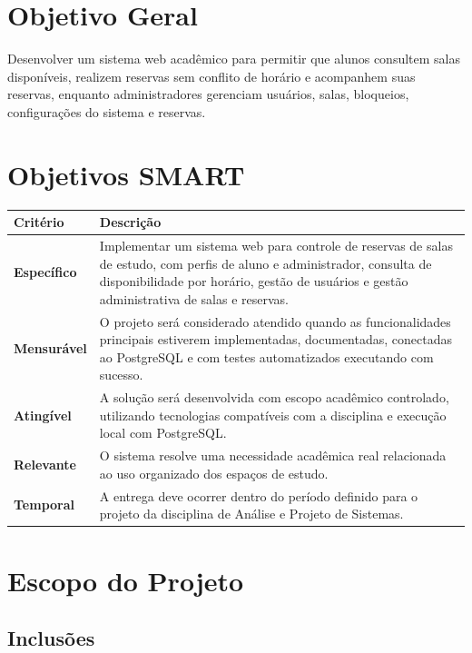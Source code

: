 \documentclass[12pt,a4paper]{article}
\begin{document}
\section{Objetivo Geral}

Desenvolver um sistema web acadêmico para permitir que alunos consultem salas disponíveis, realizem reservas sem conflito de horário e acompanhem suas reservas, enquanto administradores gerenciam usuários, salas, bloqueios, configurações do sistema e reservas.

\section{Objetivos SMART}

\begin{longtable}{|p{4cm}|p{11cm}|}
\hline
\textbf{Critério} & \textbf{Descrição} \\ \hline
\textbf{Específico} & Implementar um sistema web para controle de reservas de salas de estudo, com perfis de aluno e administrador, consulta de disponibilidade por horário, gestão de usuários e gestão administrativa de salas e reservas. \\ \hline
\textbf{Mensurável} & O projeto será considerado atendido quando as funcionalidades principais estiverem implementadas, documentadas, conectadas ao PostgreSQL e com testes automatizados executando com sucesso. \\ \hline
\textbf{Atingível} & A solução será desenvolvida com escopo acadêmico controlado, utilizando tecnologias compatíveis com a disciplina e execução local com PostgreSQL. \\ \hline
\textbf{Relevante} & O sistema resolve uma necessidade acadêmica real relacionada ao uso organizado dos espaços de estudo. \\ \hline
\textbf{Temporal} & A entrega deve ocorrer dentro do período definido para o projeto da disciplina de Análise e Projeto de Sistemas. \\ \hline
\end{longtable}

\section{Escopo do Projeto}

\subsection{Inclusões}
\end{document}
